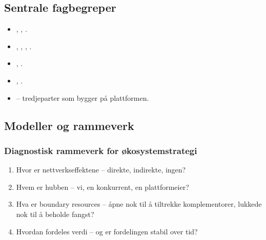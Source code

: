 \subsection{Sentrale fagbegreper}
\begin{itemize}
  \item {}, , .
  \item {}, ,
    , .
  \item {}, .
  \item {}, .
  \item {} -- tredjeparter som bygger på plattformen.
\end{itemize}

\subsection{Modeller og rammeverk}



\subsubsection*{Diagnostisk rammeverk for økosystemstrategi}
\begin{enumerate}
  \item Hvor er nettverkseffektene -- direkte, indirekte, ingen?
  \item Hvem er hubben -- vi, en konkurrent, en plattformeier?
  \item Hva er boundary resources -- åpne nok til å tiltrekke
    komplementorer, lukkede nok til å beholde fangst?
  \item Hvordan fordeles verdi -- og er fordelingen stabil over tid?
\end{enumerate}

